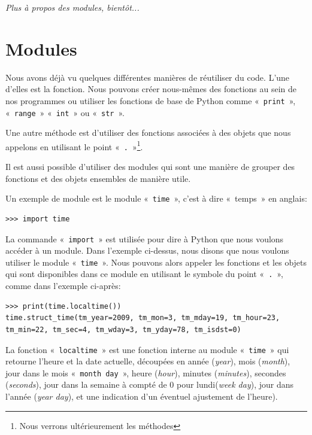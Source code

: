 \emph{Plus à propos des modules, bientôt...}

\section{Modules}
Nous avons déjà vu quelques différentes manières de réutiliser du code. L'une d'elles est la fonction. Nous pouvons créer nous-mêmes des fonctions au sein de nos programmes ou utiliser les fonctions de base de Python comme «~\texttt{print}~», «~\texttt{range}~» «~\texttt{int}~» ou «~\texttt{str}~». 

Une autre méthode est d'utiliser des fonctions associées à des objets que nous appelons en utilisant le point «~\texttt{.}~»\footnote{Nous verrons ultérieurement les méthodes}.
 
Il est aussi possible d'utiliser des modules qui sont une manière de grouper des fonctions et des objets ensembles de manière utile.

Un exemple de module est le module «~\texttt{time}~», c'est à dire «~temps~»   en anglais:

\begin{Verbatim}[frame=single,rulecolor=\color{mbleu}, label=à taper]
>>> import time
\end{Verbatim}

La commande «~\texttt{import}~» est utilisée pour dire à Python que nous voulons accéder à un module.
Dans l'exemple ci-dessus, nous disons que nous voulons utiliser le module «~\texttt{time}~».
Nous pouvons alors appeler les fonctions et les objets qui sont disponibles dans ce module en utilisant le symbole du point «~\texttt{.}~», comme dans l'exemple ci-après:

\begin{Verbatim}[frame=single,rulecolor=\color{mbleu}, label=à taper]
>>> print(time.localtime())
time.struct_time(tm_year=2009, tm_mon=3, tm_mday=19, tm_hour=23, 
tm_min=22, tm_sec=4, tm_wday=3, tm_yday=78, tm_isdst=0)
\end{Verbatim}

La fonction «~\texttt{localtime}~» est une fonction interne au module «~\texttt{time}~» qui retourne l'heure et la date actuelle, découpées en année (\emph{year}), mois (\emph{month}), jour dans le mois «~\texttt{month day}~», heure (\emph{hour}), minutes (\emph{minutes}), secondes (\emph{seconds}), jour dans la semaine à compté de 0 pour lundi(\emph{week day}), jour dans l'année (\emph{year day}), et une indication d'un éventuel ajustement de l'heure).

